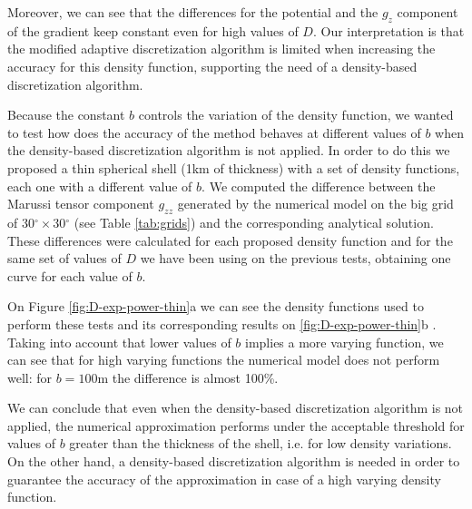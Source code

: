 \documentclass[extra]{gji}
\begin{document}
Moreover, we can see that the differences for the potential and the $g_z$ component of the gradient keep constant even for high values of $D$.
Our interpretation is that the modified adaptive discretization algorithm is limited when increasing the accuracy for this density function, supporting the need of a density-based discretization algorithm.

Because the constant $b$ controls the variation of the density function, we wanted to test how does the accuracy of the method behaves at different values of $b$ when the density-based discretization algorithm is not applied.
In order to do this we proposed a thin spherical shell (1km of thickness) with a set of density functions, each one with a different value of $b$.
We computed the difference between the Marussi tensor component $g_{zz}$ generated by the numerical model on the big grid of 30$^\circ\times$30$^\circ$ (see Table \ref{tab:grids}) and the corresponding analytical solution.
These differences were calculated for each proposed density function and for the same set of values of $D$ we have been using on the previous tests, obtaining one curve for each value of $b$.

On Figure \ref{fig:D-exp-power-thin}a we can see the density functions used to perform these tests and its corresponding results on \ref{fig:D-exp-power-thin}b .
Taking into account that lower values of $b$ implies a more varying function, we can see that for high varying functions the numerical model does not perform well: for $b=100$m the difference is almost 100\%.

We can conclude that even when the density-based discretization algorithm is not applied, the numerical approximation performs under the acceptable threshold for values of $b$ greater than the thickness of the shell, i.e. for low density variations.
On the other hand, a density-based discretization algorithm is needed in order to guarantee the accuracy of the approximation in case of a high varying density function.
\end{document}
